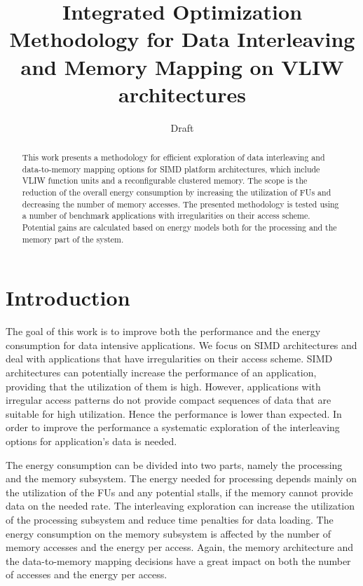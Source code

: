 \documentclass[runningheads,a4paper]{llncs}
\begin{document}
\mainmatter  %
\title{Integrated Optimization Methodology for Data Interleaving and Memory Mapping on VLIW architectures}
\author{Draft}
\maketitle

\begin{abstract}
This work presents a methodology for efficient exploration of data interleaving and data-to-memory mapping options for SIMD platform architectures, which include VLIW function units and a reconfigurable clustered memory. 
The scope is the reduction of the overall energy consumption by increasing the utilization of FUs and decreasing the number of memory accesses.
The presented methodology is tested using a number of benchmark applications with irregularities on their access scheme.
Potential gains are calculated based on energy models both for the processing and the memory part of the system.

\end{abstract}

\section{Introduction}

The goal of this work is to improve both the performance and the energy consumption for data intensive applications. 
We focus on SIMD architectures and deal with applications that have irregularities on their access scheme. 
SIMD architectures can potentially increase the performance of an application, providing that the utilization of them is high. 
However, applications with irregular access patterns do not provide compact sequences of data that are suitable for high utilization. 
Hence the performance is lower than expected. 
In order to improve the performance a systematic exploration of the interleaving options for application's data is needed. 

The energy consumption can be divided into two parts, namely the processing and the memory subsystem. 
The energy needed for processing depends mainly on the utilization of the FUs and any potential stalls, if the memory cannot provide data on the needed rate.
The interleaving exploration can increase the utilization of the processing subsystem and reduce time penalties for data loading.   
The energy consumption on the memory subsystem is affected by the number of memory accesses and the energy per access. 
Again, the memory architecture and the data-to-memory mapping decisions have a great impact on both the number of accesses and the energy per access.
\end{document}
